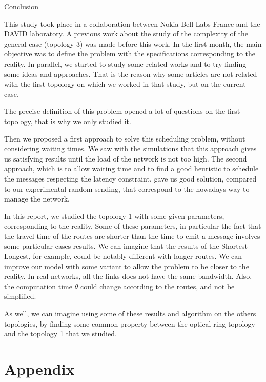 \documentclass[a4paper,10pt]{report}
\begin{document}
\begin{chapter}{Conclusion}

This study took place in a collaboration between Nokia Bell Labs France and the DAVID laboratory.
A previous work about the study of the complexity of the general case (topology 3) was made before this work.
In the first month, the main objective was to define the problem with the specifications corresponding to the reality.
In parallel, we started to study some related works and to try finding some ideas and approaches. That is the reason why some articles are not related
with the first topology on which we worked in that study, but on the current case.

The precise definition of this problem opened a lot of questions on the first topology, that is why we only studied it.

Then we proposed a first approach to solve this scheduling problem, without considering waiting times. We saw with the simulations 
that this approach gives us satisfying results until the load of the network is not too high.
The second approach, which is to allow waiting time and to find a good heuristic to schedule the messages respecting the latency constraint,
gave us good solution, compared to our experimental random sending, that correspond to the nowadays way to manage the network.

In this report, we studied the topology 1 with some given parameters, corresponding to the reality. Some of these parameters, in particular the fact that the travel time of the routes are shorter than the time to emit a message involves some particular cases results. We can imagine that the results of the Shortest Longest, for example, could be notably different with longer routes.
We can improve our model with some variant to allow the problem to be closer to the reality. In real networks, all the links does not have the same bandwidth. Also, the computation time $\theta$ could change according to the routes, and not be simplified.

As well, we can imagine using some of these results and algorithm on the others topologies, by finding some common property between the optical ring topology and the topology 1 that we studied.
\end{chapter}
\appendix

\chapter*{Appendix}
\end{document}
